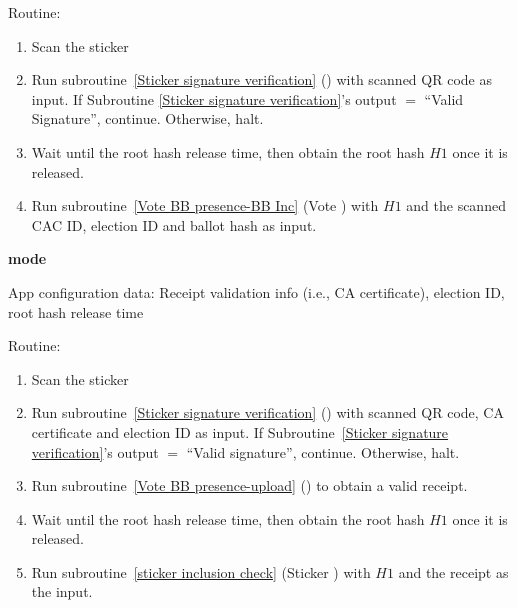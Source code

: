 \documentclass{article}
\begin{document}
Routine:
\begin{enumerate}
    \item Scan the sticker
    \item Run subroutine~\ref{Sticker signature verification} (\StickersignatureVerification{}) with scanned QR code as input. If Subroutine \ref{Sticker signature verification}'s output $=$ ``Valid Signature'', continue. Otherwise, halt.
    \item Wait until the root hash release time, then obtain the root hash $H1$ once it is released.
    \item Run subroutine~\ref{Vote BB presence-BB Inc} (Vote \BBInclusionCheck{}) with  $H1$ and the scanned CAC ID, election ID and ballot hash as input.
    
\end{enumerate}

\textbf{\StickerBBUpload{}{} mode}

App configuration data: Receipt validation info (i.e., CA certificate), election ID, root hash release time


Routine:
\begin{enumerate}
    \item Scan the sticker
    \item Run subroutine~\ref{Sticker signature verification} (\StickersignatureVerification{}) with scanned QR code, CA certificate and election ID as input. If Subroutine~\ref{Sticker signature verification}'s output $=$ ``Valid signature'', continue. Otherwise, halt.
    \item Run subroutine~\ref{Vote BB presence-upload} (\StickerBBUpload{}) to obtain a valid receipt.
    \item Wait until the root hash release time, then obtain the root hash $H1$ once it is released.
    \item Run subroutine~\ref{sticker inclusion check} (Sticker \BBInclusionCheck{}) with  $H1$ and the receipt as the input.
\end{enumerate}
\end{document}
